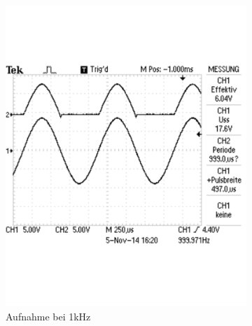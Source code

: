 \documentclass[12pt,a4paper]{article}
\begin{document}
\begin{figure}[H]
\begin{subfigure}[b]{0.28\textwidth}
                \includegraphics[width=\textwidth , scale = 0.4]{2_1_2.pdf}
                \caption[Aufnahme bei 1kHz]{Aufnahme bei 1kHz}
                \label{fig:2_1_2}
        \end{subfigure}
        \hfill
        \begin{subfigure}[b]{0.28\textwidth}

\end{subfigure}
\end{figure}
\end{document}
